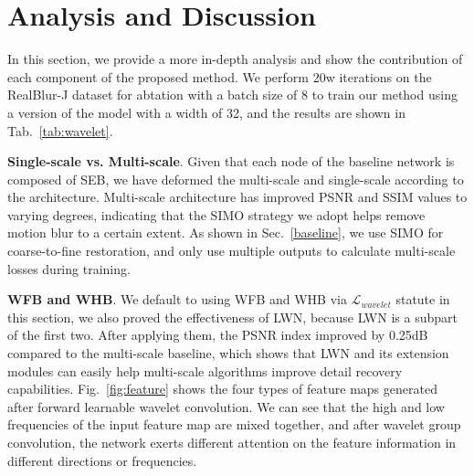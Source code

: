 \documentclass[10pt,twocolumn,letterpaper]{article}
\begin{document}
\section{Analysis and Discussion}
\label{analysis}
In this section, we provide a more in-depth analysis and show the contribution of each component of the proposed method.
We perform 20w iterations on the RealBlur-J dataset for abtation with a batch size of 8 to train our method using a version of the model with a width of 32, and the results are shown in Tab.~\ref{tab:wavelet}.

\noindent\textbf{Single-scale vs. Multi-scale}. 
Given that each node of the baseline network is composed of SEB, we have deformed the multi-scale and single-scale according to the architecture.
Multi-scale architecture has improved PSNR and SSIM values to varying degrees, indicating that the SIMO strategy we adopt helps remove motion blur to a certain extent.
As shown in Sec.~\ref{baseline}, we use SIMO for coarse-to-fine restoration, and only use multiple outputs to calculate multi-scale losses during training.

\noindent\textbf{WFB and WHB}.
We default to using WFB and WHB via $\mathcal{L}_{wavelet}$ statute in this section, we also proved the effectiveness of LWN, because LWN is a subpart of the first two.
After applying them, the PSNR index improved by 0.25dB compared to the multi-scale baseline, which shows that LWN and its extension modules can easily help multi-scale algorithms improve detail recovery capabilities. 
Fig.~\ref{fig:feature} shows the four types of feature maps generated after forward learnable wavelet convolution. We can see that the high and low frequencies of the input feature map are mixed together, and after wavelet group convolution, the network exerts different attention on the feature information in different directions or frequencies.
\end{document}
